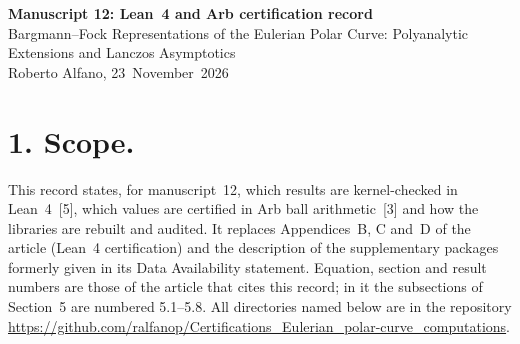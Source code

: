 \documentclass[11pt,a4paper]{article}
\newcommand{\R}{https://github.com/ralfanop/Certifications_Eulerian_polar-curve_computations}
\newcommand{\WholeURL}[1]{\hfil\penalty200\hfilneg\mbox{\url{#1}}}
\begin{document}
\begin{center}
{\Large\bfseries Manuscript 12: Lean~4 and Arb certification record}\\[6pt]
{\large Bargmann--Fock Representations of the Eulerian Polar Curve: Polyanalytic Extensions and Lanczos Asymptotics}\\[6pt]
Roberto Alfano, 23~November~2026
\end{center}

\section*{1. Scope.}
This record states, for manuscript~12, which results are kernel-checked in Lean~4~[5], which values are certified in Arb ball arithmetic~[3] and how the libraries are rebuilt and audited. It replaces Appendices~B, C and~D of the article (Lean~4 certification) and the description of the supplementary packages formerly given in its Data Availability statement. Equation, section and result numbers are those of the article that cites this record; in it the subsections of Section~5 are numbered 5.1--5.8. All directories named below are in the repository \WholeURL{\R}.
\end{document}
